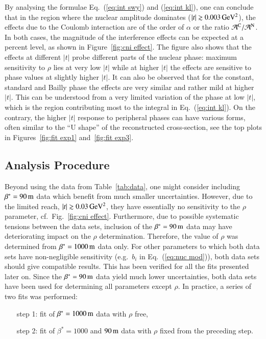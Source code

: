 By analysing the formulae Eq.~(\ref{eq:int swy}) and (\ref{eq:int kl}), one can conclude that in the region where the nuclear amplitude dominates ($|t| \gtrsim 0.003\,{\rm GeV^2}$), the effects due to the Coulomb interaction are of the order of $\alpha$ or the ratio ${\cal A}^{\rm C} / {\cal A}^{\rm N}$. In both cases, the magnitude of the interference effects can be expected at a percent level, as shown in Figure~\ref{fig:cni effect}. The figure also shows that the effects at different $|t|$ probe different parts of the nuclear phase: maximum sensitivity to $\rho$ lies at very low $|t|$ while at higher $|t|$ the effects are sensitive to phase values at slightly higher $|t|$. It can also be observed that for the constant, standard and Bailly phase the effects are very similar and rather mild at higher $|t|$. This can be understood from a very limited variation of the phase at low $|t|$, which is the region contributing most to the integral in Eq.~(\ref{eq:int kl}). On the contrary, the higher $|t|$ response to peripheral phases can have various forms, often similar to the ``U shape'' of the reconstructed cross-section, see the top plots in Figures~\ref{fig:fit exp1} and~\ref{fig:fit exp3}.


\subsection{Analysis Procedure}
\label{sec:cni anal proc}

Beyond using the data from Table~\ref{tab:data}, one might consider including $\beta^* = 90\,{\rm m}$ data \cite{8tev-90m} which benefit from much smaller uncertainties. However, due to the limited reach, $|t| \gtrsim 0.03\,{\rm GeV^2}$, they have essentially no sensitivity to the $\rho$ parameter, cf.~Fig.~\ref{fig:cni effect}. Furthermore, due to possible systematic tensions between the data sets, inclusion of the $\beta^* = 90\,{\rm m}$ data may have deteriorating impact on the $\rho$ determination. Therefore, the value of $\rho$ was determined from $\beta^* = 1000\,{\rm m}$ data only. For other parameters to which both data sets have non-negligible sensitivity (e.g.~$b_i$ in Eq.~(\ref{eq:nuc mod})), both data sets should give compatible results. This has been verified for all the fits presented later on. Since the $\beta^* = 90\,{\rm m}$ data yield much lower uncertainties, both data sets have been used for determining all parameters except $\rho$. In practice, a series of two fits was performed:
\begin{enumerate}[leftmargin=2cm]
\item[step 1:] fit of $\beta^* = 1000\,{\rm m}$ data with $\rho$ free,
\item[step 2:] fit of $\beta^* = 1000$ and $90\,{\rm m}$ data with $\rho$ fixed from the preceding step.
\end{enumerate}

